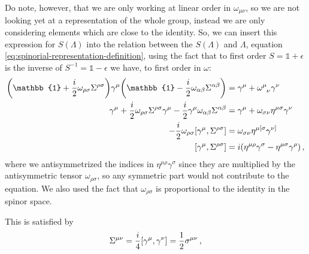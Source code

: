 \documentclass[main.tex]{subfiles}
\begin{document}
Do note, however, that we are only working at linear order in \(\omega_{\mu \nu }\), so we are not looking yet at a representation of the whole group, instead we are only considering elements which are close to the identity. 
So, we can insert this expression for \(S(\Lambda )\) into the relation between the \(S(\Lambda )\) and \(\Lambda \), equation \eqref{eq:spinorial-representation-definition}, using the fact that to first order \(S = \mathbb{1} + \epsilon \) is the inverse of \(S^{-1} = \mathbb{1} - \epsilon \) we have, to first order in \(\omega \): 
%
\begin{subequations}
\begin{align}
\qty(\mathbb{1} + \frac{i}{2} \omega_{\rho \sigma } \Sigma^{\rho \sigma }) \gamma^{\mu } \qty(\mathbb{1} - \frac{i}{2} \omega_{\alpha \beta } \Sigma^{\alpha \beta }) &= \gamma^{ \mu} +\tensor{\omega}{^{\mu }_{\nu }} \gamma^{\nu } \\
\gamma^{\mu } + \frac{i}{2} \omega_{\rho \sigma } \Sigma^{\rho \sigma } \gamma^{ \mu } - \frac{i}{2} \gamma^{\mu }\omega_{\alpha \beta } \Sigma^{\alpha \beta } &= \gamma^{\mu } + \omega_{\sigma \nu } \eta^{\mu \sigma } \gamma^{\nu }  \\
-\frac{i}{2} \omega_{\rho \sigma } \qty[\gamma^{\mu }, \Sigma^{\rho \sigma }] &= \omega_{\sigma \nu } \eta^{\mu [\sigma } \gamma^{\nu ]}  \\
\qty[\gamma^{\mu }, \Sigma^{\rho \sigma }] &= i \qty(\eta^{\mu \rho } \gamma^{\sigma } - \eta^{\mu \sigma } \gamma^{\rho })
\,,
\end{align}
\end{subequations}
%
where we antisymmetrized the indices in \(\eta^{\mu \rho } \gamma^{\sigma }\) since they are multiplied by the antisymmetric tensor \(\omega_{\rho \sigma }\), so any symmetric part would not contribute to the equation. 
We also used the fact that \(\omega_{\rho \sigma } \) is proportional to the identity in the spinor space. 

\begin{claim}
This is satisfied by 
%
\begin{align}
\Sigma^{\mu \nu } = \frac{i}{4} \qty[\gamma^{\mu }, \gamma^{\nu }] = \frac{1}{2} \sigma^{\mu \nu }
\,,
\end{align}
\end{claim}
\end{document}
